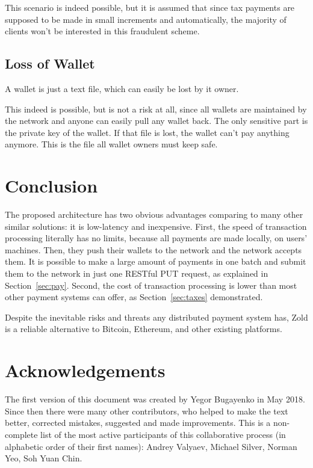 \documentclass{main}
\begin{document}
This scenario is indeed possible, but it is assumed that since tax payments are
supposed to be made in small increments and automatically, the majority of
clients won't be interested in this fraudulent scheme.

\subsection{Loss of Wallet}

A wallet is just a text file, which can easily be lost by it owner.

This indeed is possible, but is not a risk at all, since all wallets are
maintained by the network and anyone can easily pull any wallet back.
The only sensitive part is the private key of the wallet. If that file
is lost, the wallet can't pay anything anymore. This is the file all
wallet owners must keep safe.

\section{Conclusion}

The proposed architecture has two obvious advantages comparing to many other
similar solutions: it is low-latency and inexpensive. First, the speed of transaction processing
literally has no limits, because all payments are made locally, on users'
machines. Then, they push their wallets to the network and the network accepts
them. It is possible to make a large amount of payments in one batch and
submit them to the network in just one RESTful PUT request, as explained
in Section~\ref{sec:pay}. Second, the cost of transaction processing
is lower than most other payment systems can offer, as Section~\ref{sec:taxes}
demonstrated.

Despite the inevitable risks and threats any distributed payment system
has, Zold is a reliable alternative to Bitcoin, Ethereum, and
other existing platforms.

\section{Acknowledgements}

The first version of this document was created by Yegor Bugayenko in May 2018.
Since then there were many other contributors, who helped to make the text better,
corrected mistakes, suggested and made improvements. This is a non-complete list
of the most active participants of this collaborative process
(in alphabetic order of their first names):
%
Andrey Valyaev,
Michael Silver,
Norman Yeo,
Soh Yuan Chin.

\raggedright
\printbibliography%
\end{document}
